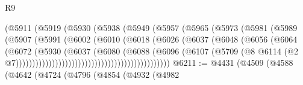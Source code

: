 \begin{lexlean}{R9}
\begin{coremodule}
                                      (@5911
                                        (@5919
                                          (@5930
                                            (@5938
                                              (@5949
                                                (@5957
                                                  (@5965
                                                    (@5973
                                                      (@5981
                                                        (@5989
                                                          (@5907
                                                            (@5991
                                                              (@6002
                                                                (@6010
                                                                  (@6018
                                                                    (@6026
                                                                      (@6037
                                                                        (@6048
                                                                          (@6056
                                                                            (@6064
                                                                              (@6072
                                                                                (@5930
                                                                                  (@6037
                                                                                    (@6080
                                                                                      (@6088
                                                                                        (@6096
                                                                                          (@6107
                                                                                            (@5709
                                                                                              (@8
                                                                                                @6114
                                                                                                (@2
                                                                                                  @7)))))))))))))))))))))))))))))))))))))))))))))))
@6211 := @4431
    (@4509
      (@4588
        (@4642
          (@4724
            (@4796
              (@4854
                (@4932
                  (@4982

\end{coremodule}
\end{lexlean}
